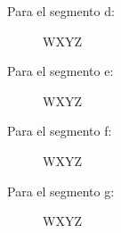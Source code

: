   Para el segmento d:
  \begin{figure}[H]
    \begin{center}
      \begin{Karnaugh}{W}{X}{Y}{Z}
      \end{Karnaugh}
    \end{center}
  \end{figure}

  Para el segmento e:
  \begin{figure}[H]
    \begin{center}
      \begin{Karnaugh}{W}{X}{Y}{Z}
      \end{Karnaugh}
    \end{center}
  \end{figure}

  Para el segmento f:
  \begin{figure}[H]
    \begin{center}
      \begin{Karnaugh}{W}{X}{Y}{Z}
      \end{Karnaugh}
    \end{center}
  \end{figure}

  Para el segmento g:
  \begin{figure}[H]
    \begin{center}
      \begin{Karnaugh}{W}{X}{Y}{Z}
      \end{Karnaugh}
    \end{center}
  \end{figure}
